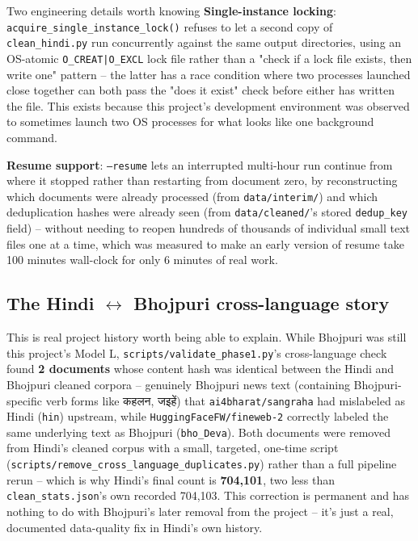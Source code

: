\documentclass[11pt]{report}
\newcommand{\dn}[1]{{\devanagarifont #1}}
\begin{document}
\begin{implementation}{Two engineering details worth knowing}
\textbf{Single-instance locking}: \texttt{acquire\_single\_instance\_lock()}
refuses to let a second copy of \texttt{clean\_hindi.py} run concurrently
against the same output directories, using an OS-atomic
\texttt{O\_CREAT|O\_EXCL} lock file rather than a "check if a lock file
exists, then write one" pattern -- the latter has a race condition where
two processes launched close together can both pass the "does it exist"
check before either has written the file. This exists because this
project's development environment was observed to sometimes launch two
OS processes for what looks like one background command.

\textbf{Resume support}: \texttt{--resume} lets an interrupted multi-hour
run continue from where it stopped rather than restarting from document
zero, by reconstructing which documents were already processed (from
\texttt{data/interim/}) and which deduplication hashes were already seen
(from \texttt{data/cleaned/}'s stored \texttt{dedup\_key} field) --
without needing to reopen hundreds of thousands of individual small text
files one at a time, which was measured to make an early version of
resume take 100 minutes wall-clock for only 6 minutes of real work.
\end{implementation}

\subsection{The Hindi $\leftrightarrow$ Bhojpuri cross-language story}
\label{sec:hindi-crosslang-history}

This is real project history worth being able to explain. While Bhojpuri
was still this project's Model L, \texttt{scripts/validate\_phase1.py}'s
cross-language check found \textbf{2 documents} whose content hash was
identical between the Hindi and Bhojpuri cleaned corpora -- genuinely
Bhojpuri news text (containing Bhojpuri-specific verb forms like
\dn{कहलन}, \dn{जइहें}) that \texttt{ai4bharat/sangraha} had mislabeled as
Hindi (\texttt{hin}) upstream, while \texttt{HuggingFaceFW/fineweb-2}
correctly labeled the same underlying text as Bhojpuri
(\texttt{bho\_Deva}). Both documents were removed from Hindi's cleaned
corpus with a small, targeted, one-time script
(\texttt{scripts/remove\_cross\_language\_duplicates.py}) rather than a
full pipeline rerun -- which is why Hindi's final count is
\textbf{704,101}, two less than \texttt{clean\_stats.json}'s own recorded
704,103. This correction is permanent and has nothing to do with
Bhojpuri's later removal from the project -- it's just a real, documented
data-quality fix in Hindi's own history.
\end{document}
